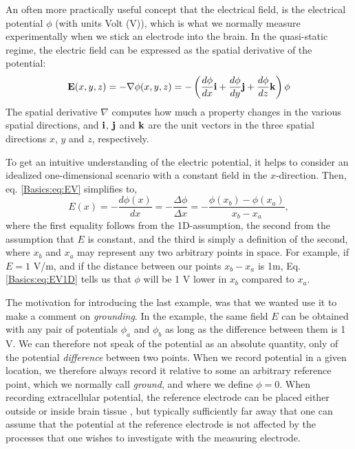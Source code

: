 {\subsubsection{}
An often more practically useful concept that the electrical field, is the electrical potential $\phi$ (with units Volt (V)), which is what we normally measure experimentally when we stick an electrode into the brain. In the quasi-static regime, the electric field can be expressed as the spatial derivative of the potential:
\begin{equation}
{\bf E}(x,y,z) = - \nabla \phi(x,y,z) = - \left(\frac{d\phi}{dx} {\bf i}  + \frac{d\phi}{dy} {\bf j} + \frac{d\phi}{dz} {\bf k} \right)
\phi 
\label{Basics:eq:EV}
\end{equation}
The spatial derivative $\nabla$ computes how much a property changes in the various spatial directions, and ${\bf i}$, ${\bf j}$ and  ${\bf k}$ are the unit vectors in the three spatial directions $x$, $y$ and $z$, respectively. 

To get an intuitive understanding of the electric potential, it helps to consider an idealized one-dimensional scenario with a constant field in the $x$-direction. Then, eq. \ref{Basics:eq:EV} simplifies to,
\begin{equation}
E(x) = -\frac{d\phi(x)}{dx} = -\frac{\Delta \phi}{\Delta x} = -\frac{\phi(x_b)-\phi(x_a)}{x_b-x_a},
\label{Basics:eq:EV1D}
\end{equation}
where the first equality follows from the 1D-assumption, the second from the assumption that $E$ is constant, and the third is simply a definition of the second, where $x_b$ and $x_a$ may represent any two arbitrary points in space. For example, if $E = 1$ V/m, and if the distance between our points $x_b-x_a$ is 1m, Eq. \ref{Basics:eq:EV1D} tells us that $\phi$ will be 1 V  lower in $x_b$ compared to $x_a$.

The motivation for introducing the last example, was that we wanted use it to make a comment on \textit{grounding}. In the example, the same field $E$ can be obtained with any pair of potentials $\phi_a$ and $\phi_b$ as long as the difference between them is 1 V. We can therefore not speak of the potential as an absolute quantity, only of the potential \textit{difference} between two points. When we record potential in a given location, we therefore always record it relative to some an arbitrary reference point, which we normally call \textit{ground}, and where we define $\phi = 0$. When recording extracellular potential, the reference electrode can be placed either outside or inside brain tissue \cite{Sharott2015}, but typically sufficiently far away that one can assume that the potential at the reference electrode is not affected by the processes that one wishes to investigate with the measuring electrode. 


}
